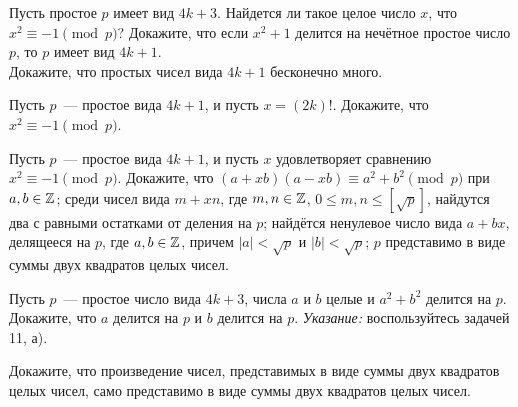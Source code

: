 \documentclass[a4paper, 11pt]{article}
\begin{document}


Пусть простое $p$ имеет вид $4k+3$. Найдется ли такое целое число $x$, что $x^2\equiv-1\!\pmod{p}$?
Докажите, что если $x^2+1$ делится на неч\"етное простое число $p$,
то $p$ имеет вид $4k+1$.\\
Докажите, что простых чисел вида $4k+1$ бесконечно много.









 Пусть $p$~--- простое вида $4k + 1$, и пусть $x=(2k)!$. Докажите, что
$x^2 \equiv -1 \pmod{p}$.

 Пусть $p$~--- простое вида $4k + 1$, и пусть $x$ удовлетворяет сравнению $x^2 \equiv -1 \pmod{p}$. Докажите, что
 $(a + xb)(a - xb)\equiv a^2 + b^2 \pmod{p}$ при $a,b\in\mathbb{Z}$;
 среди чисел вида $m + xn$, где $m,n\in\mathbb{Z}$, $0 \leq m,n
\leq [\sqrt p]$, найдутся два с равными остатками от деления на $p$;
 найдётся ненулевое число вида $a + bx$, делящееся на
$p$, где $a,b\in\mathbb{Z}$, причем $|a|<\sqrt p$ и $|b|<\sqrt p$;
 $p$ представимо в виде суммы двух квадратов целых чисел.

 Пусть $p$~--- простое число вида $4k+3$, числа $a$ и $b$ целые и $a^2 + b^2$ делится на $p$.
Докажите, что $a$ делится на $p$ и $b$ делится на $p$. {\it Указание:} воспользуйтесь задачей 11, а).

 Докажите, что произведение чисел, представимых в виде суммы
двух квадратов целых чисел, само представимо в виде суммы двух
квадратов целых чисел. 
\end{document}
